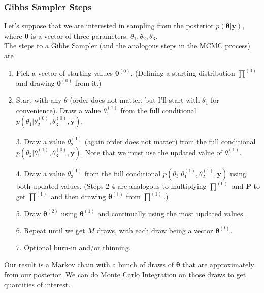 \documentclass[handout]{beamer}
\begin{document}
\begin{frame}
\frametitle{Gibbs Sampler Steps}
\pause
Let's suppose that we are interested in sampling from the posterior
$p(\bm{\theta} | \bm{y})$, where $\bm{\theta}$ is a vector of three
parameters, $\theta_1, \theta_2, \theta_3$.\\
\bigskip
\pause
The steps to a Gibbs Sampler \tiny{(and the analogous steps in
the MCMC process)} \normalsize are
\bigskip
\pause
\begin{enumerate}
\item Pick a vector of starting values $\bm{\theta}^{(0)}$.
\tiny{(Defining a starting distribution
$\prod^{(0)}$ and drawing $\bm{\theta}^{(0)}$ from it.)} \normalsize
\pause
\medskip
\item Start with any $\theta$ (order does not matter, but I'll start
with $\theta_1$ for convenience). \pause Draw a value $\theta_1^{(1)}$
from the full conditional $p(\theta_1 | \theta_2^{(0)}, \theta_3^{(0)}, \bm{y})$.
\end{enumerate}
\end{frame}

\begin{frame}
\begin{enumerate}
\item [3.] Draw a value $\theta_2^{(1)}$ (again order does not matter) from
the full conditional  $p(\theta_2 | \theta_1^{(1)}, \theta_3^{(0)},
\bm{y})$. \pause Note that we must use the updated value of $\theta_1^{(1)}$.
\pause
\medskip
\item [4.] Draw a value $\theta_3^{(1)}$ from the full conditional
$p(\theta_3 | \theta_1^{(1)}, \theta_2^{(1)}, \bm{y})$ using both
updated values. \pause \tiny{(Steps 2-4 are analogous to multiplying
$\prod^{(0)}$ and $\bm{P}$ to get $\prod^{(1)}$ and then drawing
$\bm{\theta}^{(1)}$ from $\prod^{(1)}$.)} \normalsize
\pause
\medskip
\item [5.] Draw $\bm{\theta}^{(2)}$ using $\bm{\theta}^{(1)}$ and
continually using the most updated values.
\pause
\medskip
\item [6.] Repeat until we get $M$ draws, with each draw being a vector $\bm{\theta}^{(t)}$.
\pause
\medskip
\item [7.] Optional burn-in and/or thinning.
\end{enumerate}
\pause
\bigskip
Our result is a Markov chain with a bunch of draws of $\bm{\theta}$
that are approximately from our posterior.  \pause We can do Monte
Carlo Integration on
those draws to get quantities of interest.
\end{frame}
\end{document}

